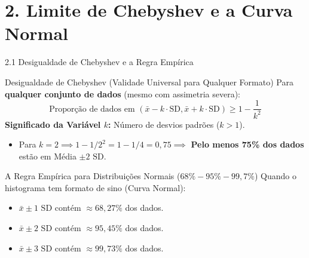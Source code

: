 \documentclass[10pt, aspectratio=169]{beamer}
\begin{document}
\section{2. Limite de Chebyshev e a Curva Normal}

\begin{frame}{2.1 Desigualdade de Chebyshev e a Regra Empírica}
    \begin{block}{Desigualdade de Chebyshev (Validade Universal para Qualquer Formato)}
        Para \textbf{qualquer conjunto de dados} (mesmo com assimetria severa):
        \[ \text{Proporção de dados em } (\bar{x} - k \cdot \text{SD}, \bar{x} + k \cdot \text{SD}) \ge 1 - \frac{1}{k^2} \]
        \textbf{Significado da Variável $k$:} Número de desvios padrões ($k > 1$).
        \begin{itemize}
            \item Para $k=2 \implies 1 - 1/2^2 = 1 - 1/4 = 0{,}75 \implies$ \textbf{Pelo menos 75\% dos dados} estão em Média $\pm 2 \text{ SD}$.
        \end{itemize}
    \end{block}

    \vspace{0.2cm}

    \begin{exampleblock}{A Regra Empírica para Distribuições Normais ($68\% - 95\% - 99{,}7\%$)}
        Quando o histograma tem formato de sino (Curva Normal):
        \begin{itemize}
            \item $\bar{x} \pm 1 \text{ SD}$ contém \textbf{$\approx 68{,}27\%$} dos dados.
            \item $\bar{x} \pm 2 \text{ SD}$ contém \textbf{$\approx 95{,}45\%$} dos dados.
            \item $\bar{x} \pm 3 \text{ SD}$ contém \textbf{$\approx 99{,}73\%$} dos dados.
        \end{itemize}
    \end{exampleblock}
\end{frame}
\end{document}
